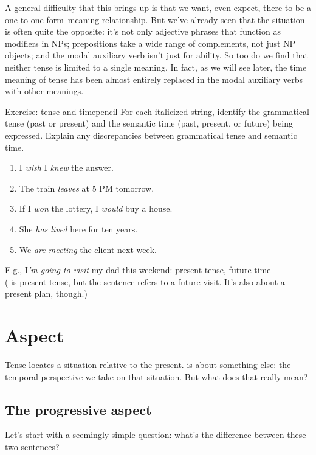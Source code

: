 A general difficulty that this brings up is that we want, even expect, there to be a one-to-one form--meaning relationship. But we've already seen that the situation is often quite the opposite: it's not only adjective phrases that function as modifiers in NPs; prepositions take a wide range of complements, not just NP objects; and the modal auxiliary verb  isn't just for ability. So too do we find that neither tense is limited to a single meaning. In fact, as we will see later, the time meaning of tense has been almost entirely replaced in the modal auxiliary verbs with other meanings.

\begin{tblsframedsymbol}{Exercise: tense and time}{pencil}
For each italicized string, identify the grammatical tense (past or present) and the semantic time (past, present, or future) being expressed. Explain any discrepancies between grammatical tense and semantic time.

\begin{enumerate}[nosep, leftmargin=*]
    \item I \emph{wish} I \emph{knew} the answer.
    \item The train \emph{leaves} at 5 PM tomorrow.
    \item If I \emph{won} the lottery, I \emph{would} buy a house.
    \item She \emph{has lived} here for ten years.
    \item We \emph{are meeting} the client next week.
\end{enumerate}

E.g., I\emph{'m going to visit} my dad this weekend: present tense, future time\\
( is present tense, but the sentence refers to a future visit. It's also about a present plan, though.)
\end{tblsframedsymbol}

\section{Aspect}
Tense locates a situation relative to the present.  is about something else: the temporal perspective we take on that situation. But what does that really mean?

\subsection{The progressive aspect}\label{sec:progressive-aspect}
Let's start with a seemingly simple question: what's the difference between these two sentences?

